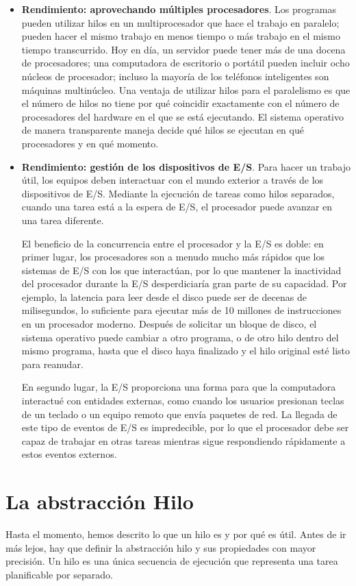 \documentclass[10pt]{book}
\begin{document}
\begin{itemize}
\item \textbf{Rendimiento: aprovechando múltiples procesadores}. Los programas pueden utilizar hilos en un multiprocesador que hace el trabajo en paralelo; pueden hacer el mismo trabajo en menos tiempo o más trabajo en el mismo tiempo transcurrido. Hoy en día, un servidor puede tener más de una docena de procesadores; una computadora de escritorio o portátil pueden incluir ocho núcleos de procesador; incluso la mayoría de los teléfonos inteligentes son máquinas multinúcleo. Una ventaja de utilizar hilos para el paralelismo es que el número de hilos no tiene por qué coincidir exactamente con el número de procesadores del hardware en el que se está ejecutando. El sistema operativo de manera transparente maneja decide qué hilos se ejecutan en qué procesadores y en qué momento.

\item \textbf{Rendimiento: gestión de los dispositivos de E/S}. Para hacer un trabajo útil, los equipos deben interactuar con el mundo exterior a través de los dispositivos de E/S. Mediante la ejecución de tareas como hilos separados, cuando una tarea está a la espera de E/S, el procesador puede avanzar en una tarea diferente.

El beneficio de la concurrencia entre el procesador y la E/S es doble: en primer lugar, los procesadores son a menudo mucho más rápidos que los sistemas de E/S con los que interactúan, por lo que mantener la inactividad del procesador durante la E/S desperdiciaría gran parte de su capacidad. Por ejemplo, la latencia para leer desde el disco puede ser de decenas de milisegundos, lo suficiente para ejecutar más de 10 millones de instrucciones en un procesador moderno. Después de solicitar un bloque de disco, el sistema operativo puede cambiar a otro programa, o de otro hilo dentro del mismo programa, hasta que el disco haya finalizado y el hilo original esté listo para reanudar.

En segundo lugar, la E/S proporciona una forma para que la computadora interactué con entidades externas, como cuando los usuarios presionan teclas de un teclado o un equipo remoto que envía paquetes de red. La llegada de este tipo de eventos de E/S es impredecible, por lo que el procesador debe ser capaz de trabajar en otras tareas mientras sigue respondiendo rápidamente a estos eventos externos.
\end{itemize}

\section{La abstracción Hilo}
Hasta el momento, hemos descrito lo que un hilo es y por qué es útil. Antes de ir más lejos, hay que definir la abstracción hilo y sus propiedades con mayor precisión. Un hilo es una única secuencia de ejecución que representa una tarea planificable por separado.
\end{document}
